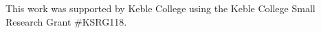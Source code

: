 \documentclass[onecolumn]{autart}
\begin{document}


\begin{ack}
This work was supported by Keble College using the Keble College Small Research Grant \#KSRG118.
\end{ack}

\newpage
\printbibliography
\end{document}
